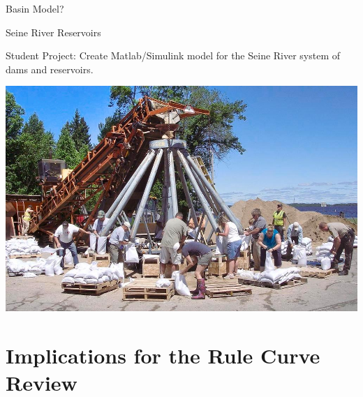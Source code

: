 \documentclass[compress,english]{beamer}
\begin{document}
\begin{frame}{Basin Model?}

\begin{center}
\end{center}

\end{frame}

\begin{frame}{Seine River Reservoirs}

Student Project: Create Matlab/Simulink model for the Seine River system of dams and reservoirs.

\begin{center}
\end{center}

\end{frame}


{\usebackgroundtemplate%
	{\includegraphics[height=\paperheight]{myersFLOOD0618c10_0.jpg}}
\section{Implications for the Rule Curve Review}
}
\end{document}
